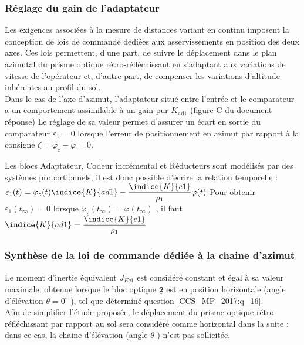 \subsubsection{Réglage du gain de l'adaptateur}
\ifprof
\else
Les exigences associées à la mesure de distances variant en continu imposent la conception de lois de commande dédiées aux asservissements en position des deux axes. Ces lois permettent, d'une part, de suivre le déplacement dans le plan azimutal du prisme optique rétro-réfléchissant en s'adaptant aux variations de vitesse de l'opérateur et, d'autre part, de compenser les variations d'altitude inhérentes au profil du sol.\\
Dans le cas de l'axe d'azimut, l'adaptateur situé entre l'entrée et le comparateur a un comportement assimilable à un gain pur $K_{\mathrm{ad} 1}$ (figure C du document réponse) Le réglage de sa valeur permet d'assurer un écart en sortie du comparateur $\varepsilon_{1}=0$ lorsque l'erreur de positionnement en azimut par rapport à la consigne $\zeta=\varphi_{\mathrm{c}}-\varphi=0$.\\
\fi


\ifprof
\begin{corrige}
Les blocs Adaptateur, Codeur incrémental et Réducteurs sont modélisés par des systèmes proportionnels, il est donc possible d’écrire la relation temporelle :  $\varepsilon_1 (t)=\varphi_c (t)  \indice{K}{ad1}-\dfrac{\indice{K}{c1}}{\rho_1} \varphi (t)$
Pour obtenir $\varepsilon_1  (t_{\infty})=0$ lorsque $\varphi_c (t_{\infty})=\varphi(t_{\infty})$ , il faut $\indice{K}{ad1}=\dfrac{\indice{K}{c1}}{\rho_1}$ 

\end{corrige}
\else
\fi

%
\subsubsection{ Synthèse de la loi de commande dédiée à la chaine d'azimut}
\ifprof
\else
Le moment d'inertie équivalent $J_{E q 1}$ est considéré constant et égal à sa valeur maximale, obtenue lorsque le bloc optique $\underline{\mathbf{2}}$ est en position horizontale (angle d'élévation $\theta=0^{\circ}$ ), tel que déterminé question \ref{CCS_MP_2017:q_16}.\\
Afin de simplifier l'étude proposée, le déplacement du prisme optique rétro-réfléchissant par rapport au sol sera considéré comme horizontal dans la suite : dans ce cas, la chaine d'élévation (angle $\theta$ ) n'est pas sollicitée.

